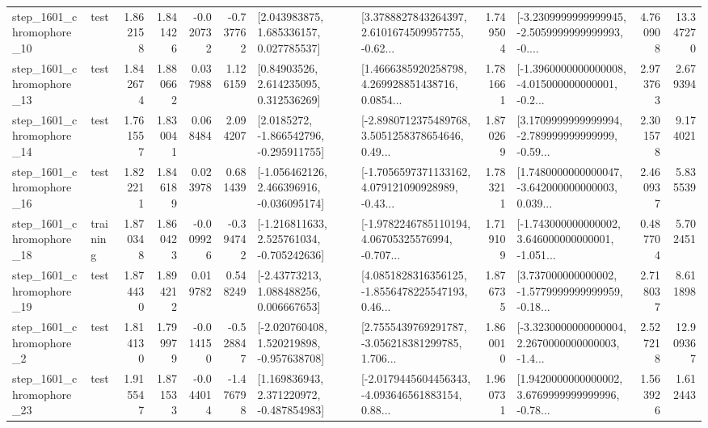 \begin{tabular}{llrrrrllrlrr}
 step\_1601\_chromophore\_10 &      test &      1.862158 &    1.841426 &     -0.020732 & -0.737762 &     [2.043983875, 1.685336157, 0.027785537] &  [3.3788827843264397, 2.6101674509957755, -0.62... &       1.749504 &  [-3.2309999999999945, -2.5059999999999993, -0.... &            4.760908 &         13.347270 \\
 step\_1601\_chromophore\_13 &      test &      1.842674 &    1.880662 &      0.037988 &  1.126159 &      [0.84903526, 2.614235095, 0.312536269] &  [1.4666385920258798, 4.269928851438716, 0.0854... &       1.781661 &  [-1.3960000000000008, -4.015000000000001, -0.2... &            2.973763 &          2.679394 \\
 step\_1601\_chromophore\_14 &      test &      1.761557 &    1.830041 &      0.068484 &  2.094207 &     [2.0185272, -1.866542796, -0.295911755] &  [-2.8980712375489768, 3.5051258378654646, 0.49... &       1.870269 &  [3.1709999999999994, -2.789999999999999, -0.59... &            2.301578 &          9.174021 \\
 step\_1601\_chromophore\_16 &      test &      1.822211 &    1.846189 &      0.023978 &  0.681439 &   [-1.056462126, 2.466396916, -0.036095174] &  [-1.7056597371133162, 4.079121090928989, -0.43... &       1.783211 &  [1.7480000000000047, -3.642000000000003, 0.039... &            2.460937 &          5.835539 \\
 step\_1601\_chromophore\_18 &  training &      1.870348 &    1.860423 &     -0.009926 & -0.394742 &   [-1.216811633, 2.525761034, -0.705242636] &  [-1.9782246785110194, 4.06705325576994, -0.707... &       1.719109 &  [-1.743000000000002, 3.646000000000001, -1.051... &            0.487704 &          5.702451 \\
 step\_1601\_chromophore\_19 &      test &      1.874430 &    1.894212 &      0.019782 &  0.548249 &     [-2.43773213, 1.088488256, 0.006667653] &  [4.0851828316356125, -1.8556478225547193, 0.46... &       1.876735 &  [3.737000000000002, -1.5779999999999959, -0.18... &            2.718037 &          8.611898 \\
  step\_1601\_chromophore\_2 &      test &      1.814130 &    1.799979 &     -0.014150 & -0.528847 &   [-2.020760408, 1.520219898, -0.957638708] &  [2.7555439769291787, -3.056218381299785, 1.706... &       1.860010 &  [-3.3230000000000004, 2.2670000000000003, -1.4... &            2.527218 &         12.909367 \\
 step\_1601\_chromophore\_23 &      test &      1.915547 &    1.871533 &     -0.044014 & -1.476798 &    [1.169836943, 2.371220972, -0.487854983] &  [-2.0179445604456343, -4.093646561883154, 0.88... &       1.960731 &  [1.9420000000000002, 3.6769999999999996, -0.78... &            1.563926 &          1.612443 \\

\end{tabular}
